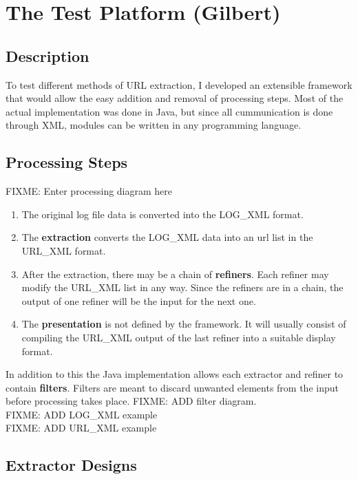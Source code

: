 \documentclass[a4paper]{danarticle}
\begin{document}
  \section*{The Test Platform (Gilbert)}
    \subsection*{Description}
      To test different methods of URL extraction, I developed an extensible
      framework that would allow the easy addition and removal of processing
      steps. Most of the actual implementation was done in Java, but since
      all cummunication is done through XML, modules can be written in any
      programming language.
    \subsection*{Processing Steps}
      FIXME: Enter processing diagram here \\
      \begin{enumerate}
        \item{The original log file data is converted into the LOG\_XML format.}
        \item{The \textbf{extraction} converts the LOG\_XML data into an url list
	      in the URL\_XML format.}
        \item{After the extraction, there may be a chain of \textbf{refiners}. 
	      Each refiner may modify the URL\_XML list in any way. Since the 
	      refiners are in a chain, the output of one refiner will be the 
	      input for the next one.}
        \item{The \textbf{presentation} is not defined by the framework. It will
	      usually consist of compiling the URL\_XML output of the last
	      refiner into a suitable display format.}
      \end{enumerate}
      In addition to this the Java implementation allows each extractor and
      refiner to contain \textbf{filters}. Filters are meant to discard 
      unwanted elements from the input before processing takes place.
      FIXME: ADD filter diagram.\\
      FIXME: ADD LOG\_XML example\\
      FIXME: ADD URL\_XML example\\
    \subsection*{Extractor Designs}
\end{document}
